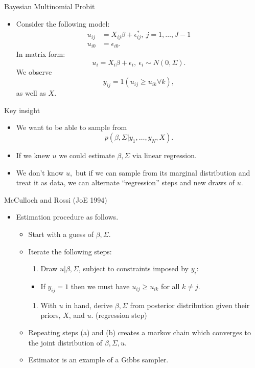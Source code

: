 \documentclass[aspectratio=169]{beamer}
\begin{document}
\begin{frame}{Bayesian Multinomial Probit}
\begin{itemize}
\item Consider the following model: 
\begin{align*}
u_{ij} & =X_{ij}\beta+\epsilon_{ij}^{*},\ j=1,\ldots,J-1\\
u_{i0} & =\epsilon_{i0}.
\end{align*}
 In matrix form: 
\[
u_{i}=X_{i}\beta+\epsilon_{i},\ \epsilon_{i}\sim N(0,\Sigma).
\]
 We observe 
\[
y_{ij}=1(u_{ij}\geq u_{ik}\forall k),
\]
 as well as $X.$
\end{itemize}
\end{frame}
%
\begin{frame}{Key insight}
\begin{itemize}
\item We want to be able to sample from 
\[
p(\beta,\Sigma|y_{1},\ldots,y_{N},X).
\]
\item If we knew $u$ we could estimate $\beta,\Sigma$ via linear regression.
\item We don't know $u,$ but if we can sample from its marginal distribution
and treat it as data, we can alternate ``regression'' steps and
new draws of $u.$
\end{itemize}
\end{frame}
%
\begin{frame}{McCulloch and Rossi (JoE 1994)}
\begin{itemize}
\item Estimation procedure as follows.
\begin{itemize}
\item Start with a guess of $\beta,\Sigma.$
\item Iterate the following steps:

\begin{enumerate}
\item Draw $u|\beta,\Sigma$, subject to constraints imposed by $y_{i}:$
\end{enumerate}
\begin{itemize}
\item If $y_{ij}=1$ then we must have $u_{ij}\geq u_{ik}$ for all $k\neq j.$
\end{itemize}
\begin{enumerate}
\item With $u$ in hand, derive $\beta,\Sigma$ from posterior distribution
given their priors, $X$, and $u.$ (regression step)
\end{enumerate}
\item Repeating steps (a) and (b) creates a markov chain which converges
to the joint distribution of $\beta,\Sigma,u$.
\item Estimator is an example of a Gibbs sampler.
\end{itemize}
\end{itemize}
\end{frame}
\end{document}
